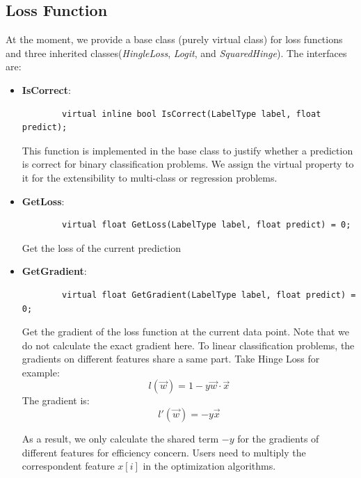 \documentclass[11pt,a4paper]{article}
\newlength{\wideitemsep}
\let\olditem\item
\renewcommand{\item}{\setlength{\itemsep}{\wideitemsep}\olditem}
\begin{document}
\subsection{Loss Function}\label{sec:loss_func}

At the moment, we provide a base class (purely virtual class) for loss
functions and three inherited classes(\emph{HingleLoss}, \emph{Logit}, and
\emph{SquaredHinge}). The interfaces are:

\begin{itemize}
    \item \textbf{IsCorrect}:
        \lstset{language=C++,
            framexleftmargin=-1cm,
            xleftmargin=-1cm,
        }        \begin{lstlisting}
        virtual inline bool IsCorrect(LabelType label, float predict);
        \end{lstlisting}

        This function is implemented in the base class to justify whether a
        prediction is correct for binary classification problems. We assign the
        virtual property to it for the extensibility to multi-class or
        regression problems.

    \item \textbf{GetLoss}:
        \lstset{language=C++}
        \begin{lstlisting}
        virtual float GetLoss(LabelType label, float predict) = 0;
        \end{lstlisting}

        Get the loss of the current prediction

    \item \textbf{GetGradient}:
        \lstset{language=C++}
        \begin{lstlisting}
        virtual float GetGradient(LabelType label, float predict) = 0;
        \end{lstlisting}

        Get the gradient of the loss function at the current data point. Note that we do not calculate the exact gradient here. To linear classification problems, the gradients on different features share a same part. Take Hinge Loss for example:
        $$l(\vec{w}) = 1 - y\vec{w}\cdot\vec{x}$$
        The gradient is:
        $$l'(\vec{w}) = -y\vec{x}$$

        As a result, we only calculate the shared term $-y$ for the gradients
        of different features for efficiency concern. Users need to multiply
        the correspondent feature $x[i]$ in the optimization algorithms.
\end{itemize}
\end{document}
